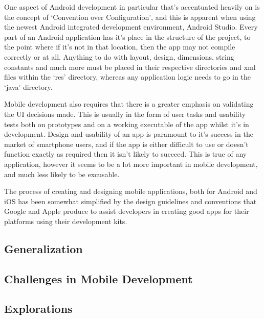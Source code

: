 \documentclass[11pt,english,numbers=endperiod,parskip=half]{scrartcl}
\begin{document}
    One aspect of Android development in particular that's accentuated heavily
    on is the concept of `Convention over Configuration', and this is apparent
    when using the newest Android integrated development environment, Android
    Studio. Every part of an Android application has it's place in the
    structure of the project, to the point where if it's not in that location,
    then the app may not compile correctly or at all. Anything to do with
    layout, design, dimensions, string constants and much more must be placed
    in their respective directories and xml files within the `res' directory,
    whereas any application logic needs to go in the `java' directory.

    Mobile development also requires that there is a greater emphasis on
    validating the UI decisions made. This is usually in the form of user tasks
    and usability tests both on prototypes and on a working executable of the
    app whilst it's in development. Design and usability of an app is paramount
    to it's success in the market of smartphone users, and if the app is either
    difficult to use or doesn't function exactly as required then it isn't
    likely to succeed. This is true of any application, however it seems to be
    a lot more important in mobile development, and much less likely to be
    excusable.

    The process of creating and designing mobile applications, both for Android
    and iOS has been somewhat simplified by the design guidelines and
    conventions that Google and Apple produce to assist developers in creating
    good apps for their platforms using their development kits.

  \subsection{Generalization}

  \subsection{Challenges in Mobile Development}

  \subsection{Explorations}
\end{document}
